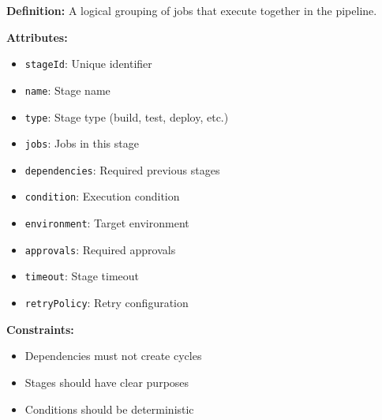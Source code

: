 \documentclass[11pt,letterpaper]{article}
\begin{document}
\begin{definitionbox}
\textbf{Definition:} A logical grouping of jobs that execute together in the pipeline.

\textbf{Attributes:}
\begin{itemize}[nosep]
    \item \texttt{stageId}: Unique identifier
    \item \texttt{name}: Stage name
    \item \texttt{type}: Stage type (build, test, deploy, etc.)
    \item \texttt{jobs}: Jobs in this stage
    \item \texttt{dependencies}: Required previous stages
    \item \texttt{condition}: Execution condition
    \item \texttt{environment}: Target environment
    \item \texttt{approvals}: Required approvals
    \item \texttt{timeout}: Stage timeout
    \item \texttt{retryPolicy}: Retry configuration
\end{itemize}

\textbf{Constraints:}
\begin{itemize}[nosep]
    \item Dependencies must not create cycles
    \item Stages should have clear purposes
    \item Conditions should be deterministic
\end{itemize}
\end{definitionbox}
\end{document}
